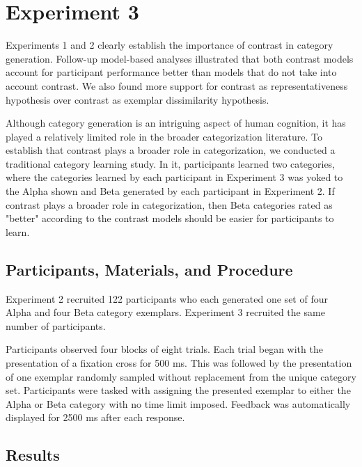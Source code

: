 

% 
\section{Experiment 3}
Experiments 1 and 2 clearly establish the importance of contrast in category generation. Follow-up model-based analyses illustrated that both contrast models account for participant performance better than models that do not take into account contrast. We also found more support for contrast as representativeness hypothesis over contrast as exemplar dissimilarity hypothesis.

Although category generation is an intriguing aspect of human cognition, it has played a relatively limited role in the broader categorization literature. To establish that contrast plays a broader role in categorization, we conducted a traditional category learning study. In it, participants learned two categories, where the categories learned by each participant in Experiment 3 was yoked to the Alpha shown and Beta generated by each participant in Experiment 2. If contrast plays a broader role in categorization, then Beta categories rated as "better" according to the contrast models should be easier for participants to learn.

\subsection{Participants, Materials, and Procedure}

Experiment 2 recruited 122 participants who each generated one set of four Alpha
and four Beta category exemplars. Experiment 3 recruited the same number of
participants. 

Participants observed four blocks of eight trials. Each trial began with the
presentation of a fixation cross for 500 ms. This was followed by the
presentation of one exemplar randomly sampled without replacement from the
unique category set. Participants were tasked with assigning the presented
exemplar to either the Alpha or Beta category with no time limit imposed.
Feedback was automatically displayed for 2500 ms after each response.

\subsection{Results}


